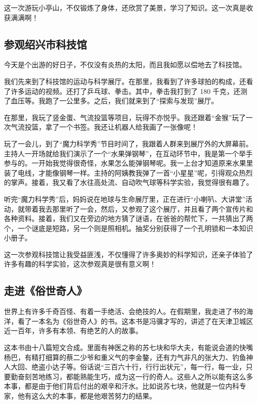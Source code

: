 \documentclass[UTF8,a4paper,titlepage,twoside,10.5pt]{article}
\begin{document}
这一次游玩小亭山，不仅锻炼了身体，还欣赏了美景，学习了知识。这一次真是收获满满啊！

\subsection{参观绍兴市科技馆}
\label{sec:orge0daa41}

今天是个出游的好日子，不仅没有炎热的太阳，而且我如愿以偿地去了科技馆。

我们先来到了科技馆的运动与科学展厅。在那里，我看到了许多球拍的构成，还看了许多运动的视频。还打了乒乓球、拳击。其中，拳击我打到了 180 千克，还测了血压等。我跑了一公里多。之后，我们就来到了“探索与发现”展厅。

在那里，我玩了竖金蛋、气流投篮等项目，玩得不亦悦乎。我还跟着“金猴”玩了一次气流投篮，拿了一个书签。我还让机器人给我画了一张像呢！

玩了一会儿，到了“魔力科学秀”节目时间了，我跟着人群来到展厅外的大屏幕前。主持人一开场就给我们演示了一个“水果弹钢琴”，在互动环节中，我是第一个举手参与的。一开始我觉得很奇怪，水果怎么能弹钢琴呢。我一上台才知道原来水果里装了电线，才能像钢琴一样。主持的阿姨教我弹了一首“小星星”呢，引得观众热烈的掌声。接着，我又看了水往高处流、自动吹气球等科学实验，我觉得很有趣了。

听完“魔力科学秀”后，妈妈说在地球与生命展厅里，正在进行“小喇叭、大讲堂”活动，就带着我去那里听了一会，然后，又参观了这个展厅，并且看了两个宣传片和各种资料。接着，我们又在旁边的地方猜了谜语，在爸爸的帮忙下，一共猜出了两个，一个谜底是短路，另一个则是照相机。抽奖分别获得了一个孔明锁和一本知识小册子。

这一次参观科技馆让我受益匪浅，不仅懂得了许多奥妙的科学知识，还亲子体验了许多有趣的科学实验，这次参观真是很有意义啊！

\subsection{走进《俗世奇人》}
\label{sec:orgeba7a02}

世界上有许多千奇百怪、有着一手绝活、会绝技的人。在假期里，我走进了书的海洋，看了一本名为《俗世奇人》的书。这本书是冯骥才写的，讲述了在天津卫城区近一百年，许多有本领、有绝艺的人的故事。

这本书由十八篇短文合成。里面有神医之称的苏七块和华大夫，有能说会道的快嘴杨巴，有精打细算的蔡二少爷和重义气的李金鏊，还有力气非凡的张大力、钓鱼神人大回、绝盗小达子等。俗话说“三百六十行，行行出状元”，每一行，每一业，只要勤奋刻苦地练习，都能熟能生巧，成为这一行的奇人。这些人之所以能有这么多本事，都是由于他们背后付出的艰辛和汗水。比如说苏七块，他就是一位内科专家，他有这么大的本事，都是他艰苦努力的结果。
\end{document}
